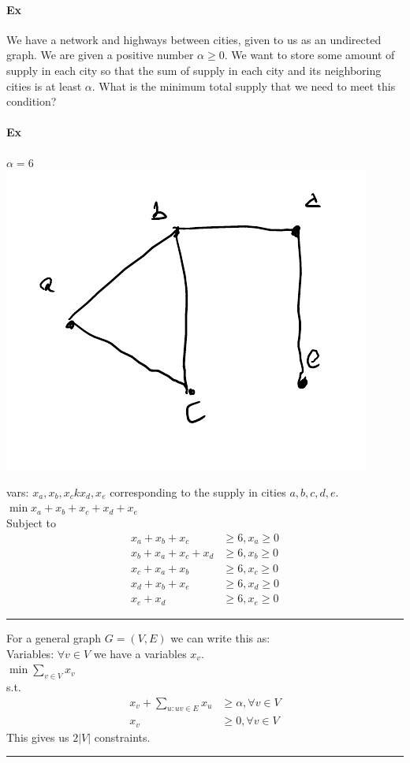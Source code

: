 \documentclass[12 pt]{article}
\begin{document}
        \paragraph{Ex} We have a network and highways between cities,
        given to us as an undirected graph. We are given a positive
        number $\alpha \geq 0$. We want to store some amount of supply
        in each city so that the sum of supply in each city and its
        neighboring cities is at least $\alpha$. What is the minimum
        total supply that we need to meet this condition?
        \paragraph{Ex} $\alpha = 6$
        \\ \includegraphics[width=.9\textwidth]{i99.pdf}

        vars: $x_a, x_b, x_ck x_d, x_e$ corresponding to the supply in
        cities $a,b,c,d,e$.
        \\ $\min x_a + x_b + x_c + x_d + x_e$
        \\ Subject to
        \begin{align*}
          x_a + x_b + x_c & \geq 6, x_a \geq 0
          \\x_b + x_a + x_c + x_d & \geq 6, x_b \geq 0
          \\x_c + x_a + x_b & \geq 6, x_c \geq 0
          \\x_d + x_b + x_e & \geq 6, x_d \geq 0
          \\ x_e + x_d & \geq 6, x_e \geq 0
        \end{align*}
        \noindent \rule{\textwidth}{0.5pt}
        For a general graph $G=(V,E)$ we can write this as:
        \\ Variables: $\forall v \in V$ we have a variables $x_v$.
        \\ $\min \sum_{v \in V}x_v$
        \\ s.t.
        \begin{align*}
          x_v + \sum_{u:uv\in E} x_u & \geq \alpha, \forall v \in V
          \\ x_v & \geq 0, \forall v \in V
        \end{align*}
        This gives us $2|V|$ constraints.
        \\\noindent \rule{\textwidth}{0.5pt}
\end{document}
